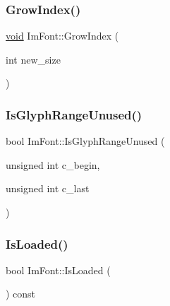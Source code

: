 \subsubsection{\texorpdfstring{Grow\+Index()}{GrowIndex()}}
{\footnotesize\ttfamily \hyperlink{imgui__impl__opengl3__loader_8h_ac668e7cffd9e2e9cfee428b9b2f34fa7}{void} Im\+Font\+::\+Grow\+Index (\begin{DoxyParamCaption}\item[{int}]{new\+\_\+size }\end{DoxyParamCaption})}

\mbox{\label{structImFont_a4374ffca4f2d9a23599aac21c57e2a66}} 
\subsubsection{\texorpdfstring{Is\+Glyph\+Range\+Unused()}{IsGlyphRangeUnused()}}
{\footnotesize\ttfamily bool Im\+Font\+::\+Is\+Glyph\+Range\+Unused (\begin{DoxyParamCaption}\item[{unsigned int}]{c\+\_\+begin,  }\item[{unsigned int}]{c\+\_\+last }\end{DoxyParamCaption})}

\mbox{\label{structImFont_a97dafa61cc94e84be396d69b0d42b1ce}} 
\subsubsection{\texorpdfstring{Is\+Loaded()}{IsLoaded()}}
{\footnotesize\ttfamily bool Im\+Font\+::\+Is\+Loaded (\begin{DoxyParamCaption}{ }\end{DoxyParamCaption}) const\hspace{0.3cm}{\ttfamily [inline]}}

\mbox{\label{structImFont_a56d4d67f36cbabafd20b95ae55541a3d}} 
